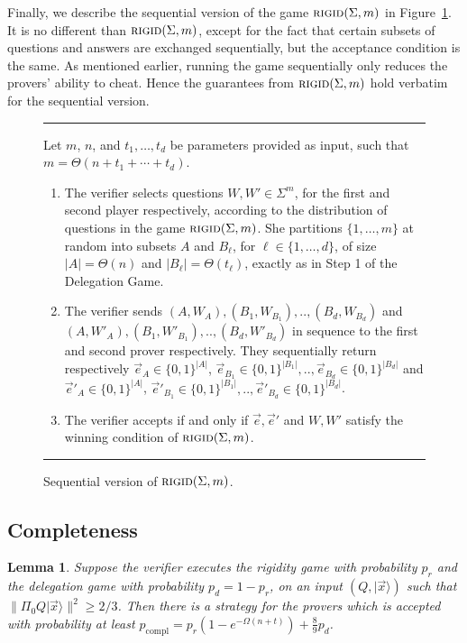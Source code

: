 \documentclass[11pt]{article}
\newtheorem{lemma}[theorem]{Lemma}
\newcommand{\ket}[1]{|#1\rangle}
\newcommand{\rigid}{\textsc{rigid}}
\begin{document}
Finally, we describe the sequential version of the game $\rigid(\Sigma,m)$ in
Figure~\ref{fig:consistency-game}. It is no different than $\rigid(\Sigma,m)$,
except for the fact that certain subsets of questions and answers are exchanged
sequentially, but the acceptance condition is the same. As mentioned earlier,
running the game sequentially only reduces the provers' ability to cheat. Hence the guarantees from $\rigid(\Sigma,m)$ 
hold verbatim for the sequential version. 

\begin{figure}[H]
\rule[1ex]{\textwidth}{0.5pt}
\vspace{-25pt}
\justify 
Let $m$, $n$, and $t_1,\ldots,t_d$ be parameters provided as input, such that $m = \Theta(n+t_1+\cdots+t_d)$. 
\begin{enumerate}
\item The verifier selects questions $W,W' \in \Sigma^{m}$, for the first and second player respectively, according to the distribution of questions in the game $\rigid(\Sigma,m)$. She partitions $\{1,\ldots,m\}$ at random into subsets $A$ and $B_\ell$, for $\ell\in\{1,\ldots,d\}$, of size $|A|=\Theta(n)$ and $|B_\ell|=\Theta(t_\ell)$, exactly as in Step 1 of the Delegation Game. 
\item The verifier sends $(A,W_A), (B_1,W_{B_1}),.., (B_d,W_{B_d})$ and $(A,W'_A), (B_1,W'_{B_1}), .., (B_d,W'_{B_d})$ in sequence to the first and second prover respectively. They sequentially return respectively $\vec{e}_A \in \{0,1\}^{|A|}$, $\vec{e}_{B_1} \in \{0,1\}^{|B_1|},.., \vec{e}_{B_d} \in \{0,1\}^{|B_d|}$ and $\vec{e}'_A \in \{0,1\}^{|A|}$, $\vec{e}'_{B_1} \in \{0,1\}^{|B_1|},.., \vec{e}'_{B_d} \in \{0,1\}^{|B_d|}$.
\item The verifier accepts if and only if $\vec{e},\vec{e}'$ and $W,W'$ satisfy the winning condition of $\rigid(\Sigma,m)$.
\end{enumerate}
\rule[2ex]{\textwidth}{0.5pt}\vspace{-.5cm}
\caption{Sequential version of $\rigid(\Sigma,m)$.}
\label{fig:consistency-game}
\end{figure} 




\subsection{Completeness}

\begin{lemma}\label{lem:leash-completeness}
Suppose the verifier executes the rigidity game with probability $p_r$ and the delegation game with probability $p_d=1-p_r$, on an input $(Q,\ket{\vec{x}})$ such that $\|\Pi_0 Q \ket{\vec{x}}\|^2 \geq 2/3$. Then there is a strategy for the provers which is accepted with probability at least $p_{\mathrm{compl}} = p_r(1-e^{-\Omega(n+t)}) + \frac{8}{9}p_d$. 
\end{lemma}
\end{document}
